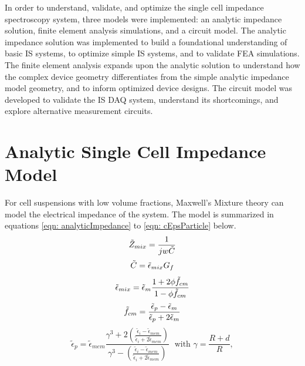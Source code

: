 \label{ch: modeling}

\par In order to understand, validate, and optimize the single cell impedance spectroscopy system, three models were implemented: an analytic impedance solution, finite element analysis simulations, and a circuit model. The analytic impedance solution was implemented to build a foundational understanding of basic IS systems, to optimize simple IS systems, and to validate FEA simulations. The finite element analysis expands upon the analytic solution to understand how the complex device geometry differentiates from the simple analytic impedance model geometry, and to inform optimized device designs. The circuit model was developed to validate the IS DAQ system, understand its shortcomings, and explore alternative measurement circuits.

\section{Analytic Single Cell Impedance Model}
\par For cell suspensions with low volume fractions, Maxwell's Mixture theory can model the electrical impedance of the system. The model is summarized in equations \ref{eqn: analyticImpedance} to \ref{eqn: cEpsParticle} below. 
\begin{equation}
    \Tilde{Z}_{mix} = \frac{1}{jw\Tilde{C}}
    \label{eqn: analyticImpedance}
\end{equation}
\begin{equation}
    \Tilde{C} = \Tilde{\epsilon}_{mix}G_f    
\end{equation}
\begin{equation}
    \Tilde{\epsilon}_{mix} = \Tilde{\epsilon}_m \frac{1 + 2\phi\Tilde{f}_{cm}}{1-\phi\Tilde{f}_{cm}}
\end{equation}
\begin{equation}
 \Tilde{f}_{cm} = \frac{\Tilde{\epsilon}_p - \Tilde{\epsilon}_{m}}{\Tilde{\epsilon}_p + 2\Tilde{\epsilon}_m}
\end{equation}
\begin{equation}
      \tilde{\epsilon}_p = \tilde{\epsilon}_{mem} 
      \frac{\gamma^3+2(\frac{\tilde{\epsilon}_i - \tilde{\epsilon}_{mem}}
      {\tilde{\epsilon}_i + 2\tilde{\epsilon}_{mem}})}{\gamma^3 - (\frac{\tilde{\epsilon}_i - \tilde{\epsilon}_{mem}}{\tilde{\epsilon}_i + 2\tilde{\epsilon}_{mem}})} \;\text{  with  } 
      \gamma = \frac{R + d}{R},
      \label{eqn: cEpsParticle}
\end{equation}

